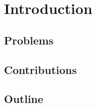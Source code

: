 
\chapter{Introduction}
\minitoc


\section{Problems}

\section{Contributions}



\section{Outline}




